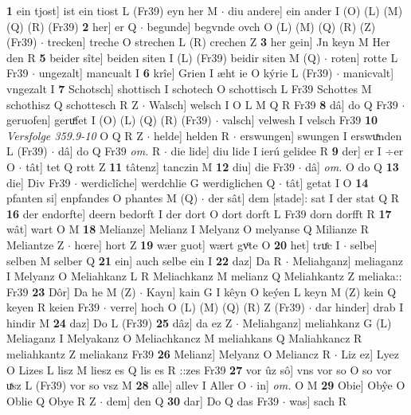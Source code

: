 \documentclass[8pt,a4paper,notitlepage]{article}
\begin{document}
\begin{table}[ht]
\begin{minipage}[t]{0.5\linewidth}
\textbf{1} ein tjost] ist ein tiost L (Fr39) eyn her M  $\cdot$ diu andere] ein ander I (O) (L) (M) (Q) (R) (Fr39) \textbf{2} her] er Q  $\cdot$ begunde] begvnde ovch O (L) (M) (Q) (R) (Z) (Fr39)  $\cdot$ trecken] treche O strechen L (R) crechen Z \textbf{3} her gein] Jn keyn M Her den R \textbf{5} beider sîte] beiden siten I (L) (Fr39) beidir siten M (Q)  $\cdot$ roten] rotte L Fr39  $\cdot$ ungezalt] mancualt I \textbf{6} krîe] Grien I æht ie O kýrie L (Fr39)  $\cdot$ manicvalt] vngezalt I \textbf{7} Schotsch] shottisch I schotech O schottisch L Fr39 Schottes M schothisz Q schottesch R Z  $\cdot$ Walsch] welsch I O L M Q R Fr39 \textbf{8} dâ] do Q Fr39  $\cdot$ geruofen] geruͤfet I (O) (L) (Q) (R) (Fr39)  $\cdot$ valsch] velwesh I velsch Fr39 \textbf{10} \textit{Versfolge 359.9-10} O Q R Z   $\cdot$ helde] helden R  $\cdot$ erswungen] swungen I erswuͯnden L (Fr39)  $\cdot$ dâ] do Q Fr39 \textit{om.} R  $\cdot$ die lide] diu lide I ierú gelidee R \textbf{9} der] er I ÷er O  $\cdot$ tât] tet Q rott Z \textbf{11} tâtenz] tanczin M \textbf{12} diu] die Fr39  $\cdot$ dâ] \textit{om.} O do Q \textbf{13} die] Div Fr39  $\cdot$ werdiclîche] werdchlie G werdiglichen Q  $\cdot$ tât] getat I O \textbf{14} pfanten si] enpfandes O phantes M (Q)  $\cdot$ der sât] dem [stade]: sat I der stat Q R \textbf{16} der endorfte] deern bedorft I der dort O dort dorft L Fr39 dorn dorfft R \textbf{17} wât] wart O M \textbf{18} Melianze] Melianz I Melyanz O melyanse Q Milianze R Meliantze Z  $\cdot$ hœre] hort Z \textbf{19} wær guot] wært gvͦte O \textbf{20} het] truͤc I  $\cdot$ selbe] selben M selber Q \textbf{21} ein] auch selbe ein I \textbf{22} daz] Da R  $\cdot$ Meliahganz] meliaganz I Melyanz O Meliahkanz L R Meliachkanz M melianz Q Meliahkantz Z meliaka:: Fr39 \textbf{23} Dôr] Da he M (Z)  $\cdot$ Kayn] kain G I kêyn O keýen L keyn M (Z) kein Q keyen R keien Fr39  $\cdot$ verre] hoch O (L) (M) (Q) (R) Z (Fr39)  $\cdot$ dar hinder] drab I hindir M \textbf{24} daz] Do L (Fr39) \textbf{25} dâz] da ez Z  $\cdot$ Meliahganz] meliahkanz G (L) Meliaganz I Melyakanz O Meliachkancz M meliahkans Q Maliahkancz R meliahkantz Z meliakanz Fr39 \textbf{26} Melianz] Melyanz O Meliancz R  $\cdot$ Liz ez] Lyez O Lizes L lisz M liesz es Q lis es R ::zes Fr39 \textbf{27} vor ûz sô] vns vor so O so vor uͯsz L (Fr39) vor so vsz M \textbf{28} alle] allev I Aller O  $\cdot$ in] \textit{om.} O M \textbf{29} Obie] Obŷe O Oblie Q Obye R Z  $\cdot$ dem] den Q \textbf{30} dar] Do Q das Fr39  $\cdot$ was] sach R \newline
\end{minipage}

\end{table}
\end{document}
